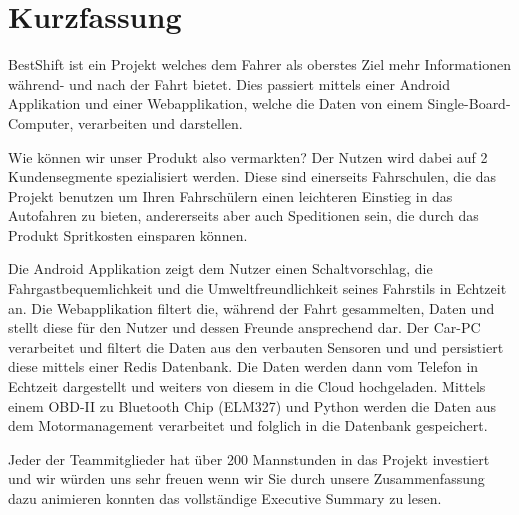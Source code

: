 \chapter{Kurzfassung}
BestShift ist ein Projekt welches dem Fahrer als oberstes Ziel mehr Informationen während- und nach der Fahrt bietet. 
Dies passiert mittels einer Android Applikation und einer Webapplikation, welche die Daten von einem Single-Board-Computer, verarbeiten und darstellen. 

\newline
Wie können wir unser Produkt also vermarkten?
Der Nutzen wird dabei auf 2 Kundensegmente spezialisiert werden.
Diese sind einerseits Fahrschulen, die das Projekt benutzen um Ihren Fahrschülern einen leichteren Einstieg in das Autofahren zu bieten, andererseits aber auch Speditionen sein, die durch das Produkt Spritkosten einsparen können.

\newline
Die Android Applikation zeigt dem Nutzer einen Schaltvorschlag, die Fahrgastbequemlichkeit und die Umweltfreundlichkeit seines Fahrstils in Echtzeit an. 
Die Webapplikation filtert die, während der Fahrt gesammelten, Daten  und stellt diese für den Nutzer und dessen Freunde ansprechend dar. 
Der Car-PC verarbeitet und filtert die Daten aus den verbauten Sensoren und  und persistiert diese mittels einer Redis Datenbank. Die Daten werden dann vom Telefon in Echtzeit dargestellt und weiters von diesem in die Cloud hochgeladen. Mittels einem OBD-II zu Bluetooth Chip (ELM327) und Python werden die Daten aus dem Motormanagement verarbeitet und folglich in die Datenbank gespeichert.

\newline
Jeder der Teammitglieder hat über 200 Mannstunden in das Projekt investiert und wir würden uns sehr freuen wenn wir Sie durch unsere Zusammenfassung dazu animieren konnten das vollständige Executive Summary zu lesen.